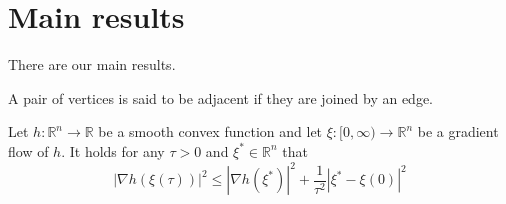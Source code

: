%

\chapter{Main results}

There are our main results.

\begin{definition}\label{Adjacent-vertices}
   \leanok
  A pair of vertices is said to be adjacent if they are joined by an edge.
\end{definition}

\begin{lemma}\label{Luo--lemma}
   \leanok
  Let $ h: \mathbb{R}^{n} \rightarrow \mathbb{R} $ be a smooth convex function and let $ \xi:[0, \infty) \rightarrow \mathbb{R}^{n} $ be a gradient flow of $ h $. It holds for any $ \tau>0 $ and $ \xi^{*} \in \mathbb{R}^{n} $ that
  $$
  |\nabla h(\xi(\tau))|^{2} \leq\left|\nabla h\left(\xi^{*}\right)\right|^{2}+\frac{1}{\tau^{2}}\left|\xi^{*}-\xi(0)\right|^{2}
  $$
  
\end{lemma}

